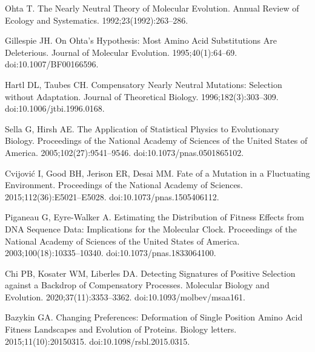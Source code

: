 \documentclass{article}
\begin{document}
\begin{thebibliography}{10}
        Ohta T.
        \newblock The Nearly Neutral Theory of Molecular Evolution.
        \newblock Annual Review of Ecology and Systematics. 1992;23(1992):263--286.

        Gillespie JH.
        \newblock On {{Ohta}}'s Hypothesis: {{Most}} Amino Acid Substitutions Are
        Deleterious.
        \newblock Journal of Molecular Evolution. 1995;40(1):64--69.
        \newblock doi:{10.1007/BF00166596}.

        Hartl DL, Taubes CH.
        \newblock Compensatory Nearly Neutral Mutations: {{Selection}} without
        Adaptation.
        \newblock Journal of Theoretical Biology. 1996;182(3):303--309.
        \newblock doi:{10.1006/jtbi.1996.0168}.

        Sella G, Hirsh AE.
        \newblock The Application of Statistical Physics to Evolutionary Biology.
        \newblock Proceedings of the National Academy of Sciences of the United States
        of America. 2005;102(27):9541--9546.
        \newblock doi:{10.1073/pnas.0501865102}.

        Cvijovi{\'c} I, Good BH, Jerison ER, Desai MM.
        \newblock Fate of a Mutation in a Fluctuating Environment.
        \newblock Proceedings of the National Academy of Sciences.
        2015;112(36):E5021--E5028.
        \newblock doi:{10.1073/pnas.1505406112}.

        Piganeau G, {Eyre-Walker} A.
        \newblock Estimating the Distribution of Fitness Effects from {{DNA}} Sequence
        Data: {{Implications}} for the Molecular Clock.
        \newblock Proceedings of the National Academy of Sciences of the United States
        of America. 2003;100(18):10335--10340.
        \newblock doi:{10.1073/pnas.1833064100}.

        Chi PB, Kosater WM, Liberles DA.
        \newblock Detecting {{Signatures}} of {{Positive Selection}} against a
            {{Backdrop}} of {{Compensatory Processes}}.
        \newblock Molecular Biology and Evolution. 2020;37(11):3353--3362.
        \newblock doi:{10.1093/molbev/msaa161}.

        Bazykin GA.
        \newblock Changing Preferences: Deformation of Single Position Amino Acid
        Fitness Landscapes and Evolution of Proteins.
        \newblock Biology letters. 2015;11(10):20150315.
        \newblock doi:{10.1098/rsbl.2015.0315}.


\end{thebibliography}
\end{document}
